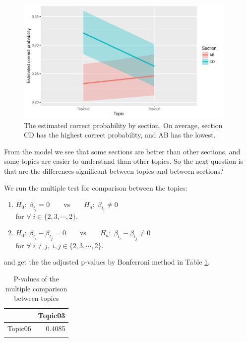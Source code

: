 \documentclass[12pt,nohyper]{tufte-handout}\usepackage[]{graphicx}\usepackage[]{color}
\begin{document}
\begin{center}
\begin{figure}
\begin{centering}
\includegraphics[width=0.95\textwidth]{Stat101_allSections_est_section}
\par\end{centering}
\caption{\label{fig:est_sec}The estimated correct probability by section.
On average, section CD has the highest correct probability, and AB has the lowest.}
\end{figure}\par\end{center}

\clearpage
From the model we see that some sections are better than other sections,
and some topics are easier to understand than other topics.
So the next question is that are the differences significant
between topics and between sections? 

We run the multiple test for comparison between the topics:
\begin{enumerate}
\item $H_{0}:\;\beta_{t_{i}}=0\qquad\textrm{vs}\qquad H_{a}:\;\beta_{t_{i}}\neq0$\\
for $\forall\; i\in\{2,3,\cdots,$2$\}$.
\item $H_{0}:\;\beta_{t_{i}}-\beta_{t_{j}}=0\qquad\textrm{vs}\qquad H_{a}:\;\beta_{t_{i}}-\beta_{t_{j}}\neq0\qquad$\\
for $\forall\; i\neq j,\; i,j\in\{2,3,\cdots,$2$\}$.
\end{enumerate}
and get the the adjusted p-values by Bonferroni method in Table \ref{tab:pvalues_topic}.

{\tiny
\begin{longtable}{rr}
  \hline
 & Topic03 \\ 
  \hline
Topic06 & 0.4085 \\ 
   \hline
\hline
\caption{P-values of the multiple comparison between topics} 
\label{tab:pvalues_topic}
\end{longtable}
}
\end{document}
